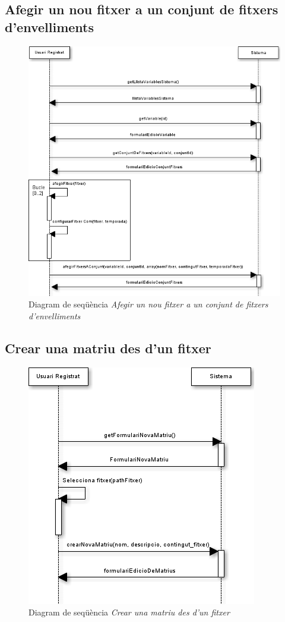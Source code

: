 \subsection*{Afegir un nou fitxer a un conjunt de fitxers d'envelliments}
\begin{figure}[H]
  \centering
  \includegraphics[scale=0.6]{img/specification/SequenceAddNewFilesToSeasonSet.png}
  \caption{Diagram de seqüència \textit{Afegir un nou fitxer a un conjunt de fitxers d'envelliments}}
  \label{fig:sequenceaddnewseason}
\end{figure}

\subsection*{Crear una matriu des d'un fitxer}
\begin{figure}[H]
  \centering
  \includegraphics[scale=0.6]{img/specification/SequenceCreateMatrix.png}
  \caption{Diagram de seqüència \textit{Crear una matriu des d'un fitxer}}
  \label{fig:sequencenewmatrixfromfile}
\end{figure}

